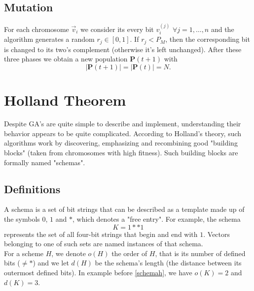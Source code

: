 \documentclass[%
    corpo=11pt,
    twoside,
    stile=classica,
    oldstyle,
    autoretitolo,
    tipotesi=magistrale,
    greek,
    evenboxes,
    english
]{toptesi}
\begin{document}
\subsection{Mutation}
For each chromosome $\vec{v}_i$ we consider its every bit $v_i^{(j)}$ $\forall j=1,\dots,n$ and the algorithm generates a random $r_j \in \left[0,1\right]$.
If $r_j < P_M$, then the corresponding bit is changed to its two's complement (otherwise it's left unchanged). After these three phases we obtain a new population $\textbf{P}(t+1)$ with 
\begin{equation}
|\textbf{P}(t+1)|=|\textbf{P}(t)|=N.
\end{equation}

\section{Holland Theorem}
Despite GA's are quite simple to describe and implement, understanding their behavior appears to be quite complicated. According to Holland's theory, such algorithms work by discovering, emphasizing and recombining good "building blocks" (taken from chromosomes with high fitness). Such building blocks are formally named "schemas". 
\subsection{Definitions}
A schema is a set of bit strings that can be described as a template made up of the symbols $0$, $1$ and $*$, which denotes a "free entry". For example, the schema
\begin{equation}
\label{schemah}
K = 1**1
\end{equation}
represents the set of all four-bit strings that begin and end with $1$. Vectors belonging to one of such sets are named instances of that schema. \\
For a scheme $H$, we denote $o(H)$ the order of $H$, that is its number of defined bits ($\neq *$) and we let $d(H)$ be the schema's length (the distance between its outermost defined bits). In example before \ref{schemah}, we have $o(K)=2$ and $d(K)=3$.
\end{document}
